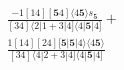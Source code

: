 \documentclass[varwidth, border=5pt]{standalone}
\begin{document}
\begin{my}
$\begin{gathered}
\scriptscriptstyle\frac{-1[14][𝟓4]⟨4𝟓⟩s_{𝟓}}{[34]⟨2|1+3|4]⟨4|𝟓|4]} +\\
\scriptscriptstyle\frac{1[14][24][𝟓|𝟓|4⟩⟨4𝟓⟩}{[34]⟨4|2+3|4]⟨4|𝟓|4]} \phantom{+}
\end{gathered}$
\end{my}
\end{document}
